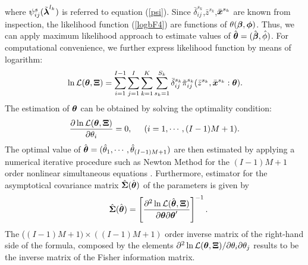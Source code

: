 where $\psi_{ij}^s(\tilde{\mbox{\boldmath$\lambda$}}^{l_k})$ is referred to equation (\ref{psi}). Since $\bar{\delta}_{ij}^{s_k}$,$\bar{z}^{s_k}$,$\bar{\mbox{\boldmath$x$}}^{s_k}$ are known from inspection, the likelihood function (\ref{logbF4}) are functions of $\theta(\mbox{\boldmath$\beta$},\mbox{\boldmath$\phi$})$. Thus, we can apply maximum likelihood approach to estimate values of $\hat{\mbox{\boldmath$\theta$}}=(\hat{\mbox{\boldmath$\beta$}},\hat{\phi})$. For computational convenience, we further express likelihood function by means of logarithm:
\begin{eqnarray}
      && \hspace{-3mm} \ln {\cal L}(\mbox{\boldmath$\theta$},\mbox{\boldmath$\Xi$}) =
      \sum_{i=1}^{I-1} \sum_{j=1}^I \sum_{k=1}^K \sum_{s_k=1}^{S_k}
      \bar{\delta}_{ij}^{s_k} \tilde{\pi}_{ij}^{s_k}(\bar{z}^{s_k},\bar{\mbox{\boldmath$x$}}^{s_k}:
      \mbox{\boldmath$\theta$}).\label{lsogbF44}
   \end{eqnarray}
The estimation of $\mbox{\boldmath$\theta$}$ can be obtained by solving the optimality condition:
\begin{eqnarray}
 \frac{ \partial \ln {\cal L}( \mbox{\boldmath$\theta$},\mbox{\boldmath$\Xi$}) }{\partial \theta_{i}}=0, \hspace{5mm} (i=1,\cdots,(I-1)M+1). \label{saitekin}
\end{eqnarray}
The optimal value of $\hat{\mbox{\boldmath$\theta$}}=(\hat{\theta}_1,\cdots,\hat{\theta}_{(I-1)M+1})$ are then estimated by applying a numerical iterative procedure such as Newton Method for the $(I-1)M+1$ order nonlinear simultaneous equations \cite{isoda}. Furthermore, estimator for the asymptotical covariance matrix $\hat{\mbox{\boldmath$\Sigma$}} (\hat{\mbox{\boldmath$\theta$}}) $ of the parameters is given by
\begin{eqnarray}
&& \hat{\mbox{\boldmath$\Sigma$}}( \hat{\mbox{\boldmath$\theta$}})
= \left[ \frac{ \partial^2\ln {\cal L}( \hat{\mbox{\boldmath$\theta$}},\mbox{\boldmath$\Xi$})}{\partial \mbox{\boldmath$\theta$} \partial \mbox{\boldmath$\theta$}'}\right]^{-1}.
\end{eqnarray}
The ($(I-1)M+1)\times((I-1)M+1)$ order inverse matrix of the right-hand side of the formula, composed by the elements $\partial^2\ln{\cal L}(\mbox{\boldmath$\theta$},\mbox{\boldmath$\Xi$})/\partial \theta_{i} \partial \theta_{j}$ results to be the inverse matrix of the Fisher information matrix.\\
